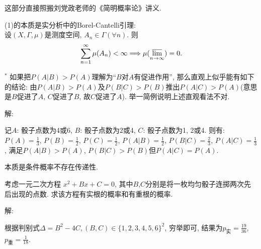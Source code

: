 \documentclass[standard]{ExBook}
\begin{document}
\begin{qitems}
\begin{bbox}
\textcolor{themeColor}{\selectfont {} 这部分直接照搬刘党政老师的《简明概率论》讲义.}

\textcolor{themeColor}{\selectfont {} (1)的本质是实分析中的Borel-Cantelli引理:\\
设$(X,\Gamma,\mu)$是测度空间, $A_{n}\in\Gamma(\forall n)$. 则
$$\sum\limits_{n=1}^{\infty}\mu(A_{n}) < \infty \Longrightarrow \mu(\varlimsup\limits_{n\to\infty})=0.$$}
    \end{bbox}

\vspace{-5em}

    \begin{bbox}
    \begin{shaded}
        \qitem$^*$
如果把$P(A|B) > P(A)$理解为“$B$对$A$有促进作用”, 那么直观上似乎能有如下的结论: 由$P(A|B) > P(A)$及$P(B|C) > P(B)$推出$P(A|C) > P(A)$(意思是$B$促进了$A$, $C$促进了$B$, 故$C$促进了$A$). 举一简例说明上述直观看法不对.
    \end{shaded}
    \end{bbox}

\vspace{-5em}

    \begin{bbox}
解: 

记$A$: 骰子点数为4或6, $B$: 骰子点数为2或4, $C$: 骰子点数为1, 2或4. 则有: $P(A)=\frac{1}{3}$, $P(B)=\frac{1}{2}$, $P(C)=\frac{1}{2}$, $P(A|B)=\frac{1}{2}$, $P(B|C)=\frac{2}{3}$, $P(A|C)=\frac{1}{3}$, 满足$P(A|B)>P(A)$, $P(B|C)>P(B)$但$P(A|C)=P(A)$.

\textcolor{themeColor}{\selectfont {} 本质是条件概率不存在传递性.}
    \end{bbox}

\vspace{-5em}

    \begin{bbox}
    \begin{shaded}
        \qitem
考虑一元二次方程 $x^{2} + Bx + C = 0$, 其中$B$,$C$分别是将一枚均匀骰子连掷两次先后出现的点数. 求该方程有实根的概率和有重根的概率.
    \end{shaded}
    \end{bbox}

\vspace{-5em}

    \begin{bbox}
解: 

根据判别式$\Delta=B^2-4C,(B,C)\in\{1,2,3,4,5,6\}^2$, 穷举即可, 结果为$p_{\text{实}}=\frac{19}{36}$, $p_{\text{重}}=\frac{1}{18}$.
    \end{bbox}


\end{qitems}
\end{document}
